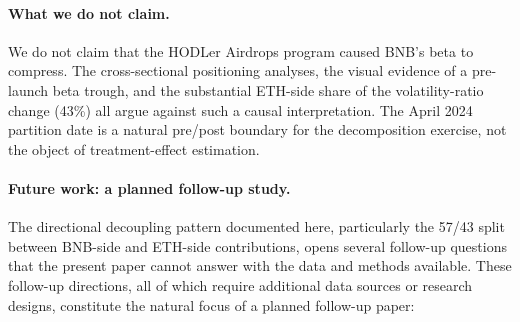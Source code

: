 \documentclass[11pt,a4paper]{article}
\begin{document}
\paragraph{What we do not claim.} We do not claim that the HODLer Airdrops program caused BNB's beta to compress. The cross-sectional positioning analyses, the visual evidence of a pre-launch beta trough, and the substantial ETH-side share of the volatility-ratio change (43\%) all argue against such a causal interpretation. The April 2024 partition date is a natural pre/post boundary for the decomposition exercise, not the object of treatment-effect estimation.

\paragraph{Future work: a planned follow-up study.} The directional decoupling pattern documented here, particularly the 57/43 split between BNB-side and ETH-side contributions, opens several follow-up questions that the present paper cannot answer with the data and methods available. These follow-up directions, all of which require additional data sources or research designs, constitute the natural focus of a planned follow-up paper:
\end{document}
